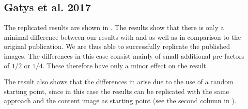 \subsection{Gatys et al. 2017} \label{sec:Gatys2results}
The replicated results are shown in . The results show that there is only a minimal difference between our results with \implementation{} and \paper{} as well as in comparison to the original publication. We are thus able to successfully replicate the published images. The differences in this case consist mainly of small additional pre-factors of $1/2$ or $1/4$. These therefore have only a minor effect on the result. 

The result also shows that the differences in  arise due to the use of a random starting point, since in this case the results can be replicated with the same approach and the content image as starting point (see the second column in ).
